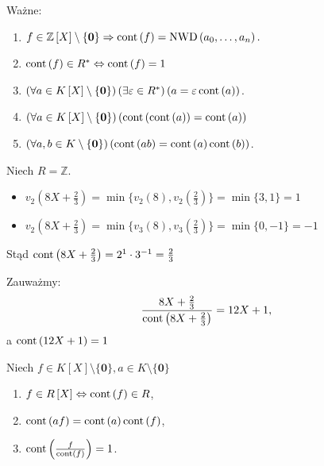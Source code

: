 \begin{remark}
	Ważne:
	\begin{enumerate}[label=\roman*)]
		\item $f\in \mathbb{Z} \left[ X \right] \setminus \{\mathbf{0}\} \Rightarrow \operatorname{cont}\left( f \right) = \text{NWD}\left( a_0,\ldots,a_{n}  \right) .$
		\item $\operatorname{cont}\left( f \right) \in R^{\ast} \Leftrightarrow \operatorname{cont}\left( f \right) = 1$
		\item $\left(\forall a \in K\left[ X \right] \setminus \{\mathbf{0}\}  \right)\left(\exists \varepsilon \in R^{\ast}  \right)\left( a = \varepsilon \operatorname{cont} \left( a \right)  \right)   $.
		\item $\left(\forall a \in K\left[ X \right] \setminus \{\mathbf{0}\}  \right)\left( \operatorname{cont} \left( \operatorname{cont} \left( a \right)  \right) = \operatorname{cont} \left( a \right)  \right)  $
		\item $\left(\forall a,b \in K\setminus \{\mathbf{0}\}  \right)\left( \operatorname{cont} \left( ab \right) = \operatorname{cont} \left( a \right) \operatorname{cont} \left( b \right)  \right)  $.
	\end{enumerate}
\end{remark} 
\begin{eg}
	Niech $R = \mathbb{Z} $.
	\begin{itemize}
		\item $v_2\left( 8X + \frac{2}{3} \right) = \min \{v_2\left( 8 \right) , v_2\left( \frac{2}{3} \right) \} = \min \{3,1\} = 1$
		\item $v_2\left( 8X + \frac{2}{3} \right) = \min \{v_3\left( 8 \right) , v_3\left( \frac{2}{3} \right) \} = \min \{0, -1\} = -1$
	\end{itemize}
	Stąd $\operatorname{cont} \left( 8X + \frac{2}{3} \right) = 2^{1}\cdot 3^{-1} = \frac{2}{3}$ 
	
	Zauważmy: 
	\[
		\frac{8X + \frac{2}{3}}{\operatorname{cont} \left( 8X + \frac{2}{3} \right) } = 12X + 1 
	,\]
	a $\operatorname{cont} \left( 12X + 1 \right) = 1$
\end{eg} 
\begin{lemma}
	Niech $f\in K\left[ X \right] \setminus \{\mathbf{0}\}, a \in K\setminus \{\mathbf{0}\}  $
	\begin{enumerate}[label=\arabic*)]
		\item $f \in R\left[ X \right] \Leftrightarrow \operatorname{cont} \left( f \right) \in R$,
		\item $\operatorname{cont} \left( af \right) = \operatorname{cont} \left( a \right) \operatorname{cont} \left( f \right) $,
		\item $\operatorname{cont} \left( \frac{f}{\operatorname{cont} \left( f \right) } \right) = 1$.
	\end{enumerate}
\end{lemma} 
